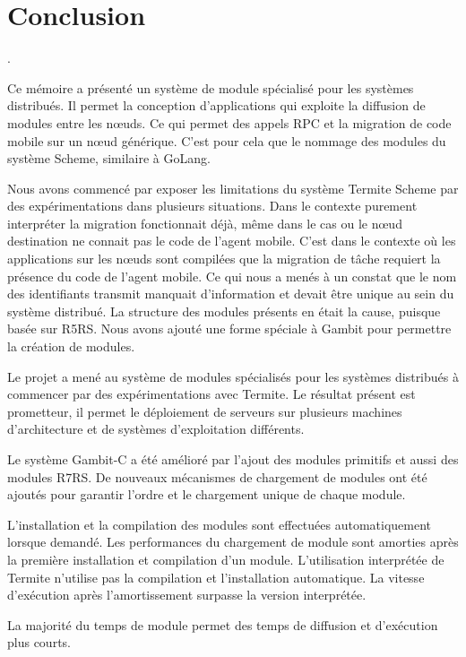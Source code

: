 
\chapter{Conclusion}.

Ce mémoire a présenté un système de module spécialisé pour les systèmes
distribués. Il permet la conception d'applications qui exploite la diffusion de
modules entre les nœuds. Ce qui permet des appels RPC et la migration de code
mobile sur un nœud générique. C'est pour cela que le nommage des modules du
système Scheme, similaire à GoLang.

Nous avons commencé par exposer les limitations du système Termite Scheme par
des expérimentations dans plusieurs situations. Dans le contexte purement
interpréter la migration fonctionnait déjà, même dans le cas ou le nœud
destination ne connait pas le code de l'agent mobile.  C'est dans le contexte
où les applications sur les nœuds sont compilées que la migration de tâche
requiert la présence du code de l'agent mobile. Ce qui nous a menés à un
constat que le nom des identifiants transmit manquait d'information et devait
être unique au sein du système distribué. La structure des modules présents en
était la cause, puisque basée sur R5RS. Nous avons ajouté une forme spéciale à
Gambit pour permettre la création de modules.

Le projet a mené au système de modules spécialisés pour les systèmes distribués
à commencer par des expérimentations avec Termite. Le résultat présent est
prometteur, il permet le déploiement de serveurs sur plusieurs machines
d'architecture et de systèmes d'exploitation différents.

Le système Gambit-C a été amélioré par l'ajout des modules primitifs et aussi
des modules R7RS. De nouveaux mécanismes de chargement de modules ont été
ajoutés pour garantir l'ordre et le chargement unique de chaque module.


L'installation et la compilation des modules sont effectuées automatiquement
lorsque demandé.  Les performances du chargement de module sont amorties après
la première installation et compilation d'un module. L'utilisation interprétée
de Termite n'utilise pas la compilation et l'installation automatique.
La vitesse d'exécution après l'amortissement surpasse la version interprétée.

La majorité du temps de module permet des temps de diffusion et d'exécution
plus courts.




